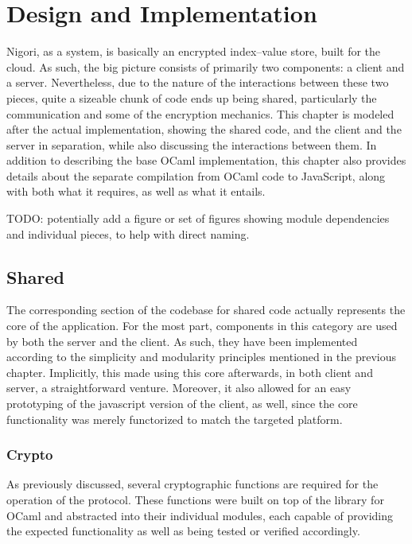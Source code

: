 \chapter{Design and Implementation} \label{chapter:implementation}
Nigori, as a system, is basically an encrypted index--value store, built for the cloud.
As such, the big picture consists of primarily two components: a client and a server.
Nevertheless, due to the nature of the interactions between these two pieces, quite a sizeable chunk of code ends up being shared, particularly the communication and some of the encryption mechanics.
This chapter is modeled after the actual implementation, showing the shared code, and the client and the server in separation, while also discussing the interactions between them.
In addition to describing the base OCaml implementation, this chapter also provides details about the separate compilation from OCaml code to JavaScript, along with both what it requires, as well as what it entails.

TODO: potentially add a figure or set of figures showing module dependencies and individual pieces, to help with direct naming.

\section{Shared}
The corresponding section of the codebase for shared code actually represents the core of the application.
For the most part, components in this category are used by both the server and the client.
As such, they have been implemented according to the simplicity and modularity principles mentioned in the previous chapter.
Implicitly, this made using this core afterwards, in both client and server, a straightforward venture.
Moreover, it also allowed for an easy prototyping of the javascript version of the client, as well, since the core functionality was merely functorized to match the targeted platform.

\subsection{Crypto}
 As previously discussed, several cryptographic functions are required for the operation of the protocol.
These functions were built on top of the  library for OCaml and abstracted into their individual modules, each capable of providing the expected functionality as well as being tested or verified accordingly.

